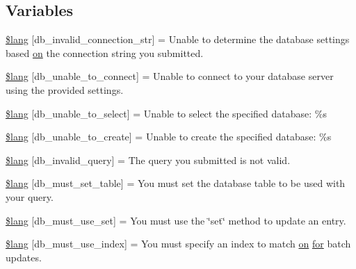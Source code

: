 \subsection*{Variables}
\begin{DoxyCompactItemize}
\item 
\hyperlink{db__lang_8php_a0c2ed2613101d37cbaba14042530c16d}{\$lang} \mbox{[}\textquotesingle{}db\+\_\+invalid\+\_\+connection\+\_\+str\textquotesingle{}\mbox{]} = \textquotesingle{}Unable to determine the database settings based \hyperlink{how_to_play_8js_af1f111425a03a603c02a2abf44ad8c43}{on} the connection string you submitted.\textquotesingle{}
\item 
\hyperlink{db__lang_8php_aa5935b86c957eb15ac7d41cf84143d66}{\$lang} \mbox{[}\textquotesingle{}db\+\_\+unable\+\_\+to\+\_\+connect\textquotesingle{}\mbox{]} = \textquotesingle{}Unable to connect to your database server using the provided settings.\textquotesingle{}
\item 
\hyperlink{db__lang_8php_a3c93974df838c0e036690874108715ea}{\$lang} \mbox{[}\textquotesingle{}db\+\_\+unable\+\_\+to\+\_\+select\textquotesingle{}\mbox{]} = \textquotesingle{}Unable to select the specified database\+: \%s\textquotesingle{}
\item 
\hyperlink{db__lang_8php_a4266e3b235feb16d9cf2e88afd1fedac}{\$lang} \mbox{[}\textquotesingle{}db\+\_\+unable\+\_\+to\+\_\+create\textquotesingle{}\mbox{]} = \textquotesingle{}Unable to create the specified database\+: \%s\textquotesingle{}
\item 
\hyperlink{db__lang_8php_a2cbf4ee929f45a29a0dcf21280bad485}{\$lang} \mbox{[}\textquotesingle{}db\+\_\+invalid\+\_\+query\textquotesingle{}\mbox{]} = \textquotesingle{}The query you submitted is not valid.\textquotesingle{}
\item 
\hyperlink{db__lang_8php_a0f5d469f071f2b5327b44761f4a06396}{\$lang} \mbox{[}\textquotesingle{}db\+\_\+must\+\_\+set\+\_\+table\textquotesingle{}\mbox{]} = \textquotesingle{}You must set the database table to be used with your query.\textquotesingle{}
\item 
\hyperlink{db__lang_8php_a55e22fb14cedc8ee7f70980bf7f37308}{\$lang} \mbox{[}\textquotesingle{}db\+\_\+must\+\_\+use\+\_\+set\textquotesingle{}\mbox{]} = \textquotesingle{}You must use the \char`\"{}set\char`\"{} method to update an entry.\textquotesingle{}
\item 
\hyperlink{db__lang_8php_a708419b6b94728c30474ee5fdde3b99b}{\$lang} \mbox{[}\textquotesingle{}db\+\_\+must\+\_\+use\+\_\+index\textquotesingle{}\mbox{]} = \textquotesingle{}You must specify an index to match \hyperlink{how_to_play_8js_af1f111425a03a603c02a2abf44ad8c43}{on} \hyperlink{confirm__transfer_8php_aaf007b9fa5c90d7c5a7011bece9cfc15}{for} batch updates.\textquotesingle{}

\end{DoxyCompactItemize}
